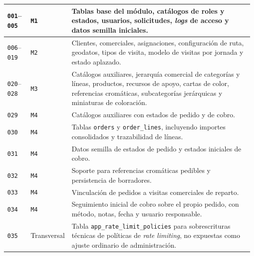 {\scriptsize
\setlength{\parskip}{0pt}
\setlength{\tabcolsep}{3pt}
\renewcommand{\arraystretch}{1.10}
\begin{supertabular}{|>{\raggedright\arraybackslash}p{0.14\textwidth}|>{\raggedright\arraybackslash}p{0.16\textwidth}|>{\raggedright\arraybackslash}p{0.62\textwidth}|}
\texttt{001}--\texttt{005} & \texttt{M1} & Tablas base del módulo, catálogos de roles y estados, usuarios, solicitudes, \textit{logs} de acceso y datos semilla iniciales.\\
\hline
\texttt{006}--\texttt{019} & \texttt{M2} & Clientes, comerciales, asignaciones, configuración de ruta, geodatos, tipos de visita, modelo de visitas por jornada y estado aplazado.\\
\hline
\texttt{020}--\texttt{028} & \texttt{M3} & Catálogos auxiliares, jerarquía comercial de categorías y líneas, productos, recursos de apoyo, cartas de color, referencias cromáticas, subcategorías jerárquicas y miniaturas de coloración.\\
\hline
\texttt{029} & \texttt{M4} & Catálogos auxiliares con estados de pedido y de cobro.\\
\hline
\texttt{030} & \texttt{M4} & Tablas \texttt{orders} y \texttt{order\_lines}, incluyendo importes consolidados y trazabilidad de líneas.\\
\hline
\texttt{031} & \texttt{M4} & Datos semilla de estados de pedido y estados iniciales de cobro.\\
\hline
\texttt{032} & \texttt{M4} & Soporte para referencias cromáticas pedibles y persistencia de borradores.\\
\hline
\texttt{033} & \texttt{M4} & Vinculación de pedidos a visitas comerciales de reparto.\\
\hline
\texttt{034} & \texttt{M4} & Seguimiento inicial de cobro sobre el propio pedido, con método, notas, fecha y usuario responsable.\\
\hline
\texttt{035} & Transversal & Tabla \texttt{app\_rate\_limit\_policies} para sobrescrituras técnicas de políticas de \textit{rate limiting}, no expuestas como ajuste ordinario de administración.\\

\end{supertabular}}
